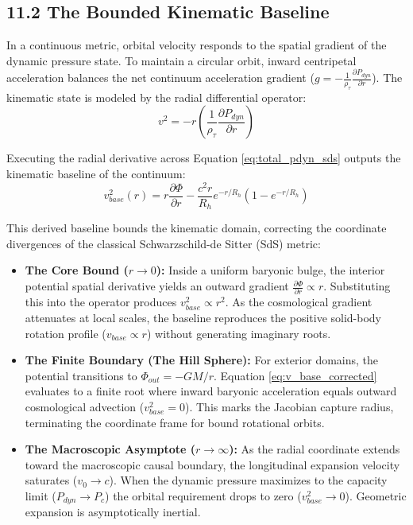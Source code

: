 \subsection*{11.2 The Bounded Kinematic Baseline} 
In a continuous metric, orbital velocity responds to the spatial gradient of the dynamic pressure state. To maintain a circular orbit, inward centripetal acceleration balances the net continuum acceleration gradient ($g = -\frac{1}{\rho_\tau} \frac{\partial P_{dyn}}{\partial r}$). The kinematic state is modeled by the radial differential operator: 
\begin{equation} 
v^2 = -r \left( \frac{1}{\rho_\tau} \frac{\partial P_{dyn}}{\partial r} \right) 
\end{equation}

Executing the radial derivative across Equation \ref{eq:total_pdyn_sds} outputs the kinematic baseline of the continuum: 
\begin{equation} 
v_{base}^2(r) = r \frac{\partial \Phi}{\partial r} - \frac{c^2 r}{R_h} e^{-r/R_h} \left(1 - e^{-r/R_h}\right) \label{eq:v_base_corrected} 
\end{equation}

This derived baseline bounds the kinematic domain, correcting the coordinate divergences of the classical Schwarzschild-de Sitter (SdS) metric: 
\begin{itemize} 
    \item \textbf{The Core Bound ($r \to 0$):} Inside a uniform baryonic bulge, the interior potential spatial derivative yields an outward gradient $\frac{\partial \Phi}{\partial r} \propto r$. Substituting this into the operator produces $v_{base}^2 \propto r^2$. As the cosmological gradient attenuates at local scales, the baseline reproduces the positive solid-body rotation profile ($v_{base} \propto r$) without generating imaginary roots.
    \item \textbf{The Finite Boundary (The Hill Sphere):} For exterior domains, the potential transitions to $\Phi_{out} = -GM/r$. Equation \ref{eq:v_base_corrected} evaluates to a finite root where inward baryonic acceleration equals outward cosmological advection ($v_{base}^2 = 0$). This marks the Jacobian capture radius, terminating the coordinate frame for bound rotational orbits. 
    \item \textbf{The Macroscopic Asymptote ($r \to \infty$):} As the radial coordinate extends toward the macroscopic causal boundary, the longitudinal expansion velocity saturates ($v_0 \to c$). When the dynamic pressure maximizes to the capacity limit ($P_{dyn} \to P_c$) the orbital requirement drops to zero ($v_{base}^2 \to 0$). Geometric expansion is asymptotically inertial.
\end{itemize}

